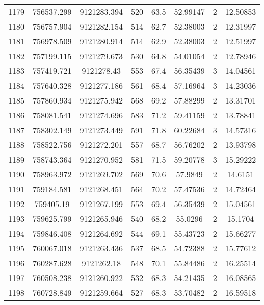 \begin{longtable}{cccccccc}
1179 & 756537.299      & 9121283.394      & 520     & 63.5  & 52.99147 & 2  & 12.50853 \\
1180 & 756757.904      & 9121282.154      & 514     & 62.7  & 52.38003 & 2  & 12.31997 \\
1181 & 756978.509      & 9121280.914      & 514     & 62.9  & 52.38003 & 2  & 12.51997 \\
1182 & 757199.115      & 9121279.673      & 530     & 64.8  & 54.01054 & 2  & 12.78946 \\
1183 & 757419.721      & 9121278.43       & 553     & 67.4  & 56.35439 & 3  & 14.04561 \\
1184 & 757640.328      & 9121277.186      & 561     & 68.4  & 57.16964 & 3  & 14.23036 \\
1185 & 757860.934      & 9121275.942      & 568     & 69.2  & 57.88299 & 2  & 13.31701 \\
1186 & 758081.541      & 9121274.696      & 583     & 71.2  & 59.41159 & 2  & 13.78841 \\
1187 & 758302.149      & 9121273.449      & 591     & 71.8  & 60.22684 & 3  & 14.57316 \\
1188 & 758522.756      & 9121272.201      & 557     & 68.7  & 56.76202 & 2  & 13.93798 \\
1189 & 758743.364      & 9121270.952      & 581     & 71.5  & 59.20778 & 3  & 15.29222 \\
1190 & 758963.972      & 9121269.702      & 569     & 70.6  & 57.9849  & 2  & 14.6151  \\
1191 & 759184.581      & 9121268.451      & 564     & 70.2  & 57.47536 & 2  & 14.72464 \\
1192 & 759405.19       & 9121267.199      & 553     & 69.4  & 56.35439 & 2  & 15.04561 \\
1193 & 759625.799      & 9121265.946      & 540     & 68.2  & 55.0296  & 2  & 15.1704  \\
1194 & 759846.408      & 9121264.692      & 544     & 69.1  & 55.43723 & 2  & 15.66277 \\
1195 & 760067.018      & 9121263.436      & 537     & 68.5  & 54.72388 & 2  & 15.77612 \\
1196 & 760287.628      & 9121262.18       & 548     & 70.1  & 55.84486 & 2  & 16.25514 \\
1197 & 760508.238      & 9121260.922      & 532     & 68.3  & 54.21435 & 2  & 16.08565 \\
1198 & 760728.849      & 9121259.664      & 527     & 68.3  & 53.70482 & 2  & 16.59518 \\

\end{longtable}
